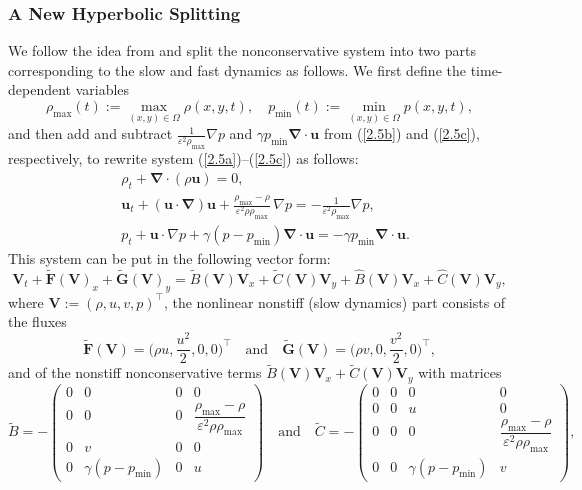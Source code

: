 \documentclass[A4paper,12pt,twoside]{article}
\numberwithin{equation}{section}
\numberwithin{figure}{section}
\numberwithin{table}{section}
\def\bnabla{\bm{\nabla}}
\newcommand{\mF}{\bm{F}}
\newcommand{\mG}{\bm{G}}
\newcommand{\ve}{\varepsilon}
\newcommand\eref[1]{(\ref{#1})}
\newcommand{\lore}[1]{{\leavevmode\color{red} #1}}
\begin{document}
\subsubsection{A New Hyperbolic Splitting}
We follow the idea from \cite{haack2012all,LCK} and split the nonconservative system into two parts corresponding to the slow and fast
dynamics as follows. We first define the time-dependent variables 
\begin{equation}
\rho_{\max}(t):=\max\limits_{(x,y)\in\Omega}\rho(x,y,t),\quad p_{\min}(t):=\min\limits_{(x,y)\in\Omega}p(x,y,t),
\label{4.3}
\end{equation}
and then add and subtract $\frac{1}{\ve^2\rho_{\max}}\nabla p$ and $\gamma p_{\min}\bnabla\cdot\bm u$ from \eref{2.5b} and \eref{2.5c},
respectively, to rewrite system \eref{2.5a}--\eref{2.5c} as follows:
\begin{align}
&\rho_t+\bnabla\!\cdot\!(\rho\bm u)=0,\label{2.1}\\
&\bm u_t+(\bm u\!\cdot\!\bnabla)\bm u+\frac{\rho_{\max}-\rho}{\ve^2\rho\rho_{\max}}\,\nabla p=-\frac{1}{\ve^2\rho_{\max}}
\nabla p,\label{2.2}\\[0.5ex]
&p_t+\bm u\!\cdot\!\nabla p+\gamma(p-p_{\min})\bnabla\!\cdot\!\bm u=-\gamma p_{\min}\bnabla\!\cdot\!\bm u.\label{2.3}
\end{align}
This system can be put in the following vector form:
\begin{equation}
\bm V_t+\widetilde{\mF}(\bm V)_x+\widetilde{\mG}(\bm V)_y=\widetilde B(\bm V)\bm V_x+\widetilde C(\bm V)\bm V_y+\widehat B(\bm V)\bm V_x+
\widehat C(\bm V)\bm V_y,
\label{4.47}
\end{equation}
where $\bm V:=(\rho,u,v,p)^\top$, the nonlinear nonstiff (slow dynamics) part consists of the fluxes
\begin{equation*}
\widetilde{\mF}(\bm V)=\Big(\rho u,\frac{u^2}{2},0,0\Big)^\top\quad\mbox{and}\quad
\widetilde{\mG}(\bm V)=\Big(\rho v,0,\frac{v^2}{2},0\Big)^\top,
\end{equation*}
and \lore{of} the nonstiff nonconservative terms %
$\widetilde B(\bm V)\bm V_x+\widetilde C(\bm V)\bm V_y$ with matrices %
\begin{equation*}
\widetilde B=-\begin{pmatrix}0&0&0&0\\0&0&0&\dfrac{\rho_{\max}-\rho}{\ve^2\rho\rho_{\max}}\\0&v&0&0\\0&\gamma(p-p_{\min})&0&u\end{pmatrix}
\quad\mbox{and}\quad
\widetilde C=-\begin{pmatrix}0&0&0&0\\0&0&u&0\\0&0&0&\dfrac{\rho_{\max}-\rho}{\ve^2\rho\rho_{\max}}\\0&0&\gamma(p-p_{\min})&v\end{pmatrix},
\end{equation*}
\end{document}
